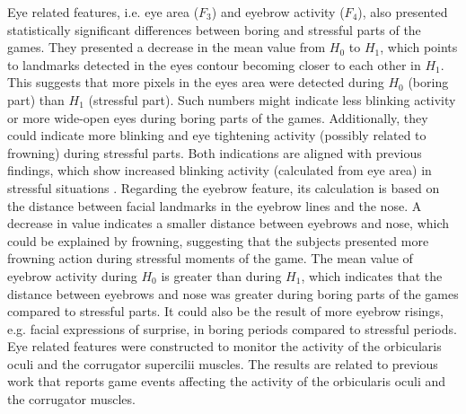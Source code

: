 Eye related features, i.e. eye area ($F_3$) and eyebrow activity ($F_4$), also presented statistically significant differences between boring and stressful parts of the games. They presented a decrease in the mean value from $H_0$ to $H_1$, which points to landmarks detected in the eyes contour becoming closer to each other in $H_1$. This suggests that more pixels in the eyes area were detected during $H_0$ (boring part) than $H_1$ (stressful part). Such numbers might indicate less blinking activity or more wide-open eyes during boring parts of the games. Additionally, they could indicate more blinking and eye tightening activity (possibly related to frowning) during stressful parts. Both indications are aligned with previous findings, which show increased blinking activity (calculated from eye area) in stressful situations \parencite{giannakakis2017stress}. Regarding the eyebrow feature, its calculation is based on the distance between facial landmarks in the eyebrow lines and the nose. A decrease in value indicates a smaller distance between eyebrows and nose, which could be explained by frowning, suggesting that the subjects presented more frowning action during stressful moments of the game. The mean value of eyebrow activity during $H_0$ is greater than during $H_1$, which indicates that the distance between eyebrows and nose was greater during boring parts of the games compared to stressful parts. It could also be the result of more eyebrow risings, e.g. facial expressions of surprise, in boring periods compared to stressful periods. Eye related features were constructed to monitor the activity of the orbicularis oculi and the corrugator supercilii muscles. The results are related to previous work that reports game events affecting the activity of the orbicularis oculi \parencite{ravaja20051} and the corrugator \parencite{hazlett2006measuring} muscles.

